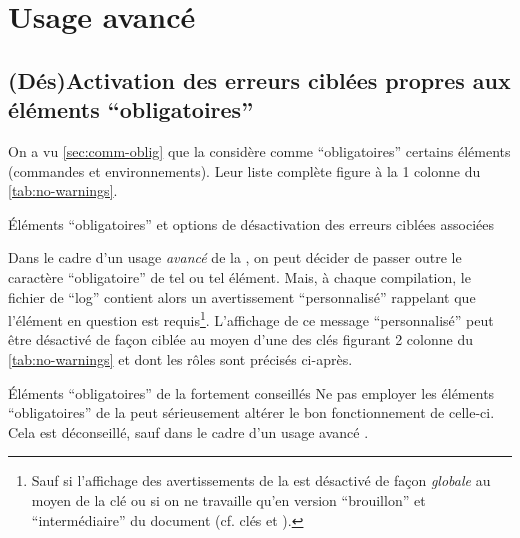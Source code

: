 \chapter{Usage avancé}\label{cha:usage-avance}

\section{(Dés)Activation des erreurs ciblées propres aux éléments
  \enquote{obligatoires}}\label{sec:desact-des-erre}

On a vu \vref{sec:comm-oblig} que la \yatcl{} considère comme
\enquote{obligatoires} certains éléments (commandes et environnements). Leur
liste complète figure à la 1\iere{} colonne du \vref{tab:no-warnings}.
\begin{table}[ht]
  \centering
  
  \caption{Éléments \enquote{obligatoires} et options de désactivation des erreurs
    ciblées associées}
  \label{tab:no-warnings}
\end{table}

Dans le cadre d'un usage \emph{avancé} de la \yatcl{}, on peut décider de
passer outre le caractère \enquote{obligatoire} de tel ou tel élément.  Mais,
à chaque compilation, le fichier de \enquote{log} contient alors un
avertissement \enquote{personnalisé} rappelant que l'élément en question est
requis\footnote{Sauf si l'affichage des avertissements de la \yatcl{} est
  désactivé de façon \emph{globale} au moyen de la clé  ou si
  on ne travaille qu'en version \enquote{brouillon} et \enquote{intermédiaire}
  du document (cf. clés  et ).}.
L'affichage de ce message \enquote{personnalisé} peut être désactivé de façon
ciblée au moyen d'une des clés figurant 2\ieme{} colonne du
\vref{tab:no-warnings} et dont les rôles sont précisés ci-après.

\begin{dbwarning}{Éléments \enquote{obligatoires} de la \yatcl{}
    fortement conseillés}{}
  Ne pas employer les éléments \enquote{obligatoires} de la \yatcl{} peut
  sérieusement altérer le bon fonctionnement de celle-ci. Cela est déconseillé,
  sauf dans le cadre d'un usage avancé .
\end{dbwarning}

